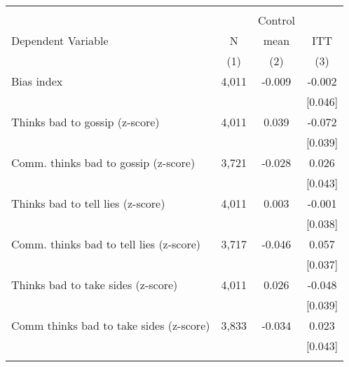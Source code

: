 \begin{tabular}{lccc}
\hline \noalign{\smallskip} &  &  & \\
 &  & Control & \\
Dependent Variable & N & mean & ITT\\
 & (1) & (2) & (3)\\
\noalign{\smallskip}\hline \noalign{\smallskip}Bias index & 4,011 & -0.009 & -0.002\\
 &  &  & [0.046]\\
\quad Thinks bad to gossip (z-score) & 4,011 & 0.039 & -0.072\\
 &  &  & [0.039]\\
\quad Comm. thinks bad to gossip (z-score) & 3,721 & -0.028 & 0.026\\
 &  &  & [0.043]\\
\quad Thinks bad to tell lies (z-score) & 4,011 & 0.003 & -0.001\\
 &  &  & [0.038]\\
\quad Comm. thinks bad to tell lies (z-score) & 3,717 & -0.046 & 0.057\\
 &  &  & [0.037]\\
\quad Thinks bad to take sides (z-score) & 4,011 & 0.026 & -0.048\\
 &  &  & [0.039]\\
\quad Comm thinks bad to take sides (z-score) & 3,833 & -0.034 & 0.023\\
 &  &  & [0.043]\\
\noalign{\smallskip}\hline\end{tabular}
